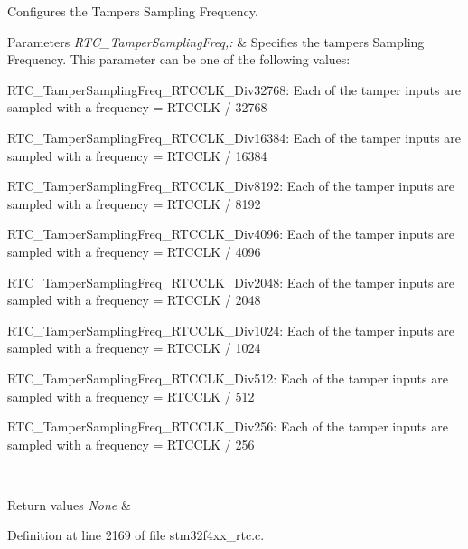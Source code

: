 Configures the Tampers Sampling Frequency. 


\begin{DoxyParams}{Parameters}
{\em R\-T\-C\-\_\-\-Tamper\-Sampling\-Freq,\-:} & Specifies the tampers Sampling Frequency. This parameter can be one of the following values\-: \begin{DoxyItemize}
\item R\-T\-C\-\_\-\-Tamper\-Sampling\-Freq\-\_\-\-R\-T\-C\-C\-L\-K\-\_\-\-Div32768\-: Each of the tamper inputs are sampled with a frequency = R\-T\-C\-C\-L\-K / 32768 \item R\-T\-C\-\_\-\-Tamper\-Sampling\-Freq\-\_\-\-R\-T\-C\-C\-L\-K\-\_\-\-Div16384\-: Each of the tamper inputs are sampled with a frequency = R\-T\-C\-C\-L\-K / 16384 \item R\-T\-C\-\_\-\-Tamper\-Sampling\-Freq\-\_\-\-R\-T\-C\-C\-L\-K\-\_\-\-Div8192\-: Each of the tamper inputs are sampled with a frequency = R\-T\-C\-C\-L\-K / 8192 \item R\-T\-C\-\_\-\-Tamper\-Sampling\-Freq\-\_\-\-R\-T\-C\-C\-L\-K\-\_\-\-Div4096\-: Each of the tamper inputs are sampled with a frequency = R\-T\-C\-C\-L\-K / 4096 \item R\-T\-C\-\_\-\-Tamper\-Sampling\-Freq\-\_\-\-R\-T\-C\-C\-L\-K\-\_\-\-Div2048\-: Each of the tamper inputs are sampled with a frequency = R\-T\-C\-C\-L\-K / 2048 \item R\-T\-C\-\_\-\-Tamper\-Sampling\-Freq\-\_\-\-R\-T\-C\-C\-L\-K\-\_\-\-Div1024\-: Each of the tamper inputs are sampled with a frequency = R\-T\-C\-C\-L\-K / 1024 \item R\-T\-C\-\_\-\-Tamper\-Sampling\-Freq\-\_\-\-R\-T\-C\-C\-L\-K\-\_\-\-Div512\-: Each of the tamper inputs are sampled with a frequency = R\-T\-C\-C\-L\-K / 512 \item R\-T\-C\-\_\-\-Tamper\-Sampling\-Freq\-\_\-\-R\-T\-C\-C\-L\-K\-\_\-\-Div256\-: Each of the tamper inputs are sampled with a frequency = R\-T\-C\-C\-L\-K / 256 \end{DoxyItemize}
\\
\hline
\end{DoxyParams}

\begin{DoxyRetVals}{Return values}
{\em None} & \\
\hline
\end{DoxyRetVals}


Definition at line 2169 of file stm32f4xx\-\_\-rtc.\-c.

